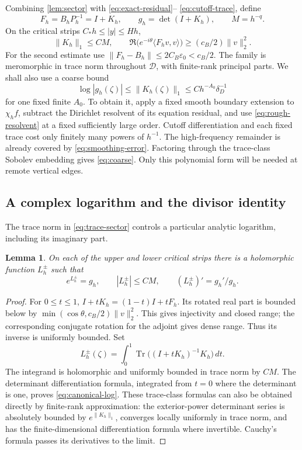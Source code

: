 \documentclass[11pt,a4paper]{article}
\DeclareMathOperator{\Tr}{Tr}
\newtheorem{lemma}[lemma]{Lemma}
\theoremstyle{remark}
\numberwithin{equation}{section}
\begin{document}
Combining \cref{lem:sector} with \eqref{eq:exact-residual}--
\eqref{eq:cutoff-trace}, define
\begin{equation}\label{eq:Fredholm}
 F_h=B_hP_h^{-1}=I+K_h,\qquad g_h=\det(I+K_h),\qquad M=h^{-q}.
\end{equation}
On the critical strips $C_*h\le|y|\le Hh$,
\begin{equation}\label{eq:trace-sector}
 \|K_h\|_1\le CM,\qquad
 \Re\big(e^{-i\theta}\langle F_hv,v\rangle\big)
 \ge(c_B/2)\|v\|_2^2.
\end{equation}
For the second estimate use
$\|F_h-B_h\|\le2C_B\varepsilon_0<c_B/2$.
The family is meromorphic in trace norm throughout $\mathcal D$,
with finite-rank principal parts. We shall also use a coarse bound
\begin{equation}\label{eq:coarse}
 \log|g_h(\zeta)|\le\|K_h(\zeta)\|_1
 \le Ch^{-A_0}\delta_D^{-1}
\end{equation}
for one fixed finite $A_0$. To obtain it, apply a fixed smooth boundary
extension to $\chi_hf$, subtract the Dirichlet resolvent of its equation
residual, and use \eqref{eq:rough-resolvent} at a fixed sufficiently
large order. Cutoff differentiation and each fixed trace cost only
finitely many powers of $h^{-1}$. The high-frequency remainder is
already covered by \eqref{eq:smoothing-error}. Factoring through the
trace-class Sobolev embedding gives \eqref{eq:coarse}. Only this
polynomial form will be needed at remote vertical edges.

\subsection{A complex logarithm and the divisor identity}
The trace norm in \eqref{eq:trace-sector} controls a particular analytic
logarithm, including its imaginary part.
\begin{lemma}\label{lem:log}
On each of the upper and lower critical strips there is a holomorphic
function $L_h^\pm$ such that
\begin{equation}\label{eq:canonical-log}
 e^{L_h^\pm}=g_h,\qquad |L_h^\pm|\le CM,\qquad
 (L_h^\pm)'=g_h'/g_h.
\end{equation}
\end{lemma}
\begin{proof}
For $0\le t\le1$, $I+tK_h=(1-t)I+tF_h$. Its rotated real part is
bounded below by $\min(\cos\theta,c_B/2)\|v\|_2^2$.
This gives injectivity and closed range; the corresponding conjugate
rotation for the adjoint gives dense range. Thus its inverse is
uniformly bounded. Set
\[
 L_h^\pm(\zeta)=\int_0^1\Tr\big((I+tK_h)^{-1}K_h\big)\,dt.
\]
The integrand is holomorphic and uniformly bounded in trace norm by
$CM$. The determinant differentiation formula, integrated from $t=0$
where the determinant is one, proves \eqref{eq:canonical-log}.
These trace-class formulas can also be obtained directly by finite-rank
approximation: the exterior-power determinant series is absolutely
bounded by $e^{\|K_h\|_1}$, converges locally uniformly in trace norm,
and has the finite-dimensional differentiation formula where invertible.
Cauchy's formula passes its derivatives to the limit.
\end{proof}
\end{document}
